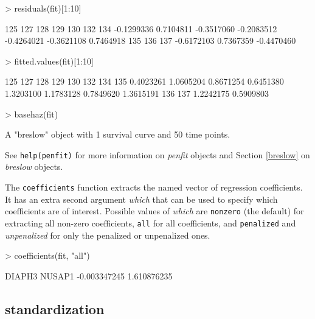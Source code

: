 \documentclass[a4paper]{article}
\newcommand{\Robject}[1]{{\texttt{#1}}}
\newcommand{\Rfunction}[1]{{\texttt{#1}}}
\newcommand{\Rclass}[1]{{\textit{#1}}}
\newcommand{\Rfunarg}[1]{{\textit{#1}}}
\begin{document}
\begin{Schunk}
\begin{Sinput}
> residuals(fit)[1:10]
\end{Sinput}
\begin{Soutput}
       125        127        128        129        130        132        134 
-0.1299336  0.7104811 -0.3517060 -0.2083512 -0.4264021 -0.3621108  0.7464918 
       135        136        137 
-0.6172103  0.7367359 -0.4470460 
\end{Soutput}
\begin{Sinput}
> fitted.values(fit)[1:10]
\end{Sinput}
\begin{Soutput}
      125       127       128       129       130       132       134       135 
0.4023261 1.0605204 0.8671254 0.6451380 1.3203100 1.1783128 0.7849620 1.3615191 
      136       137 
1.2242175 0.5909803 
\end{Soutput}
\begin{Sinput}
> basehaz(fit)
\end{Sinput}
\begin{Soutput}
A "breslow" object with 1 survival curve and 50 time points.
\end{Soutput}
\end{Schunk}

See \Robject{help(penfit)} for more information on \Rclass{penfit} objects and Section \ref{breslow} on \Rclass{breslow} objects.

The \Rfunction{coefficients} function extracts the named vector of regression coefficients. It has an extra second argument \Rfunarg{which} that can be used to specify which coefficients are of interest. Possible values of \Rfunarg{which} are \Robject{nonzero} (the default) for extracting all non-zero coefficients, \Robject{all} for all coefficients, and \Robject{penalized} and \Rfunarg{unpenalized} for only the penalized or unpenalized ones.

\begin{Schunk}
\begin{Sinput}
> coefficients(fit, "all")
\end{Sinput}
\begin{Soutput}
      DIAPH3       NUSAP1 
-0.003347245  1.610876235 
\end{Soutput}
\end{Schunk}

\subsection{standardization}
\end{document}
